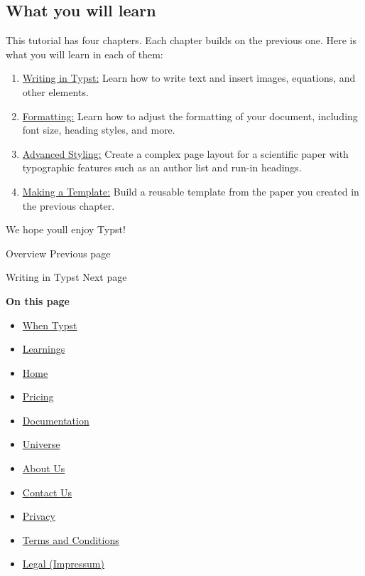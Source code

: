 \subsection{What you will learn}\label{learnings}

This tutorial has four chapters. Each chapter builds on the previous
one. Here is what you will learn in each of them:

\begin{enumerate}
\tightlist
\item
  \href{/docs/tutorial/writing-in-typst/}{Writing in Typst:} Learn how
  to write text and insert images, equations, and other elements.
\item
  \href{/docs/tutorial/formatting/}{Formatting:} Learn how to adjust the
  formatting of your document, including font size, heading styles, and
  more.
\item
  \href{/docs/tutorial/advanced-styling/}{Advanced Styling:} Create a
  complex page layout for a scientific paper with typographic features
  such as an author list and run-in headings.
\item
  \href{/docs/tutorial/making-a-template/}{Making a Template:} Build a
  reusable template from the paper you created in the previous chapter.
\end{enumerate}

We hope you\textquotesingle ll enjoy Typst!

\href{/docs/}{\pandocbounded{}}

{ Overview } { Previous page }

\href{/docs/tutorial/writing-in-typst/}{\pandocbounded{}}

{ Writing in Typst } { Next page }

\textbf{On this page}

\begin{itemize}
\tightlist
\item
  \hyperref[when-typst]{When Typst}
\item
  \hyperref[learnings]{Learnings}
\end{itemize}

\begin{itemize}
\tightlist
\item
  \href{/}{Home}
\item
  \href{/pricing/}{Pricing}
\item
  \href{/docs/}{Documentation}
\item
  \href{/universe/}{Universe}
\item
  \href{/about/}{About Us}
\item
  \href{/contact/}{Contact Us}
\item
  \href{/privacy/}{Privacy}
\item
  \href{https://typst.app/terms}{Terms and Conditions}
\item
  \href{/legal/}{Legal (Impressum)}
\end{itemize}

